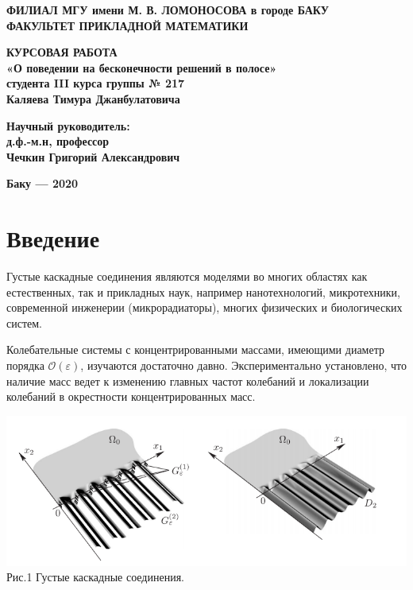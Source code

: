 \documentclass[12pt,titlepage]{report}
\begin{document}
	\pagestyle{plain}
\begin{center}
	\large{\textbf{ФИЛИАЛ МГУ имени М. В. ЛОМОНОСОВА в городе БАКУ\\[1mm]
			ФАКУЛЬТЕТ ПРИКЛАДНОЙ МАТЕМАТИКИ
	}}
\end{center}

\vskip 3.5cm
\begin{center}
	\LARGE{\textbf{КУРСОВАЯ РАБОТА} \\[1cm]}
	\large{\textbf{«О поведении на бесконечности решений в полосе»}\\[0.3cm]}
	\large{\textbf{студента III курса группы № 217}\\[0.3cm]} 
	\large{\textbf{Каляева Тимура Джанбулатовича}\\[2.1cm]}                                          
\end{center}

\begin{flushright} \large{\textbf{Научный руководитель:\\[3mm]
			д.ф.-м.н, профессор\\
			Чечкин Григорий Александрович}}
\end{flushright}

\vfill

\begin{center}
	\large{\textbf{Баку --- 2020}}
\end{center}
\pagestyle{empty}
\clearpage
\pagestyle{plain}
\clearpage
\tableofcontents
\clearpage

\section*{Введение}
Густые каскадные соединения являются моделями во многих областях как естественных, так и прикладных наук, например нанотехнологий, микротехники, современной инженерии (микрорадиаторы), многих физических и биологических
систем.

Колебательные системы с концентрированными массами, имеющими диаметр порядка $\mathcal{O}(\varepsilon)$, изучаются достаточно давно. Экспериментально установлено, что наличие масс ведет к изменению главных частот колебаний и локализации колебаний в окрестности концентрированных масс.

\begin{center}
	\includegraphics[scale=0.75]{kursac2.png}\\
	Рис.1 Густые каскадные соединения.
\end{center}
\end{document}
